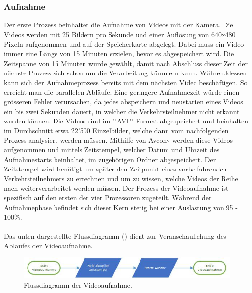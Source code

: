 \subsubsection{Aufnahme}
Der erste Prozess beinhaltet die Aufnahme von Videos mit der Kamera. Die Videos werden mit 25 Bildern pro Sekunde und einer Auflösung von 640x480 Pixeln aufgenommen und auf der Speicherkarte abgelegt. Dabei muss ein Video immer eine Länge von 15 Minuten erzielen, bevor es abgespeichert wird. Die Zeitspanne von 15 Minuten wurde gewählt, damit nach Abschluss dieser Zeit der nächste Prozess sich schon um die Verarbeitung kümmern kann.  Währenddessen kann sich der Aufnahmeprozess bereits mit dem nächsten Video beschäftigen. So erreicht man die parallelen Abläufe. Eine geringere Aufnahmezeit würde einen grösseren Fehler verursachen, da jedes abspeichern und neustarten eines Videos ein bis zwei Sekunden dauert, in welcher die Verkehrsteilnehmer nicht erkannt werden können. Die Videos sind im "'AVI"' Format abgespeichert und beinhalten im Durchschnitt etwa 22'500 Einzelbilder, welche dann vom nachfolgenden Prozess analysiert werden müssen. Mithilfe von Avconv werden diese Videos aufgenommen und mittels Zeitstempel, welcher Datum und Uhrzeit des Aufnahmestarts beinhaltet, im zugehörigen Ordner abgespeichert. Der Zeitstempel wird benötigt um später den Zeitpunkt eines vorbeifahrenden Verkehrsteilnehmers zu errechnen und um zu wissen, welche Videos der Reihe nach weiterverarbeitet werden müssen. Der Prozess der Videoaufnahme ist spezifisch auf den ersten der vier Prozessoren zugeteilt. Während der Aufnahmephase befindet sich dieser Kern stetig bei einer Auslastung von 95 - 100\%.\\\\
Das unten dargestellte Flussdiagramm () dient zur Veranschaulichung des Ablaufes der Videoaufnahme.

\begin{figure}[H]
  \centering
  \includegraphics[width=0.99\textwidth]{Software/Fluss_Videoaufnahme.jpg} 
  \caption{Flussdiagramm der Videoaufnahme.}
  \label{bFlussVideo}
\end{figure}

